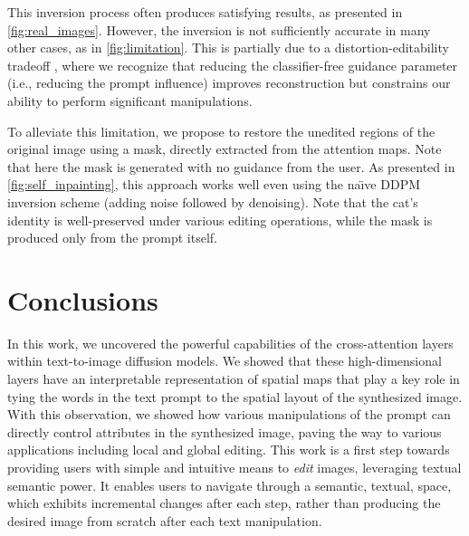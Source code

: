 This inversion process often produces satisfying results, as presented in \ref{fig:real_images}. 
However, the inversion is not sufficiently accurate in many other cases, as in \ref{fig:limitation}.
This is partially due to a distortion-editability tradeoff \cite{tov2021designing}, where we recognize that reducing the classifier-free guidance \cite{ho2021classifier} parameter (i.e., reducing the prompt influence) improves reconstruction but constrains our ability to perform significant manipulations. 

To alleviate this limitation, we propose to restore the unedited regions of the original image using a mask, directly extracted from the attention maps. Note that here the mask is generated with no guidance from the user. As presented in \ref{fig:self_inpainting}, this approach works well even using the na\"{\i}ve DDPM inversion scheme (adding noise followed by denoising). Note that the cat's identity is well-preserved under various editing operations, while the mask is produced only from the prompt itself.

\section{Conclusions}

In this work, we uncovered the powerful capabilities of the cross-attention layers within text-to-image diffusion models. We showed that these high-dimensional layers have an interpretable representation of spatial maps that play a key role in tying the words in the text prompt to the spatial layout of the synthesized image. With this observation, we showed how various manipulations of the prompt can directly control attributes in the synthesized image, paving the way to various applications including local and global editing. This work is a first step towards providing users with simple and intuitive means to \textit{edit} images, leveraging textual semantic power. It enables users to navigate through a semantic, textual, space, which exhibits incremental changes after each step, rather than producing the desired image from scratch after each text manipulation.

